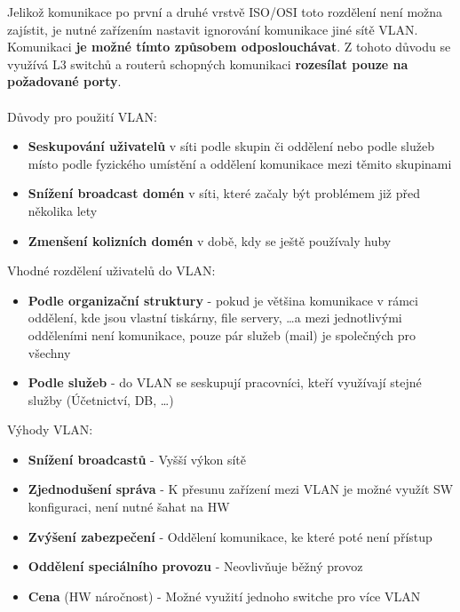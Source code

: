Jelikož komunikace po první a druhé vrstvě ISO/OSI toto rozdělení není možna zajístit, je nutné zařízením nastavit ignorování komunikace jiné sítě VLAN.
Komunikaci \textbf{je možné tímto způsobem odposlouchávat}.
Z tohoto důvodu se využívá L3 switchů a routerů schopných komunikaci \textbf{rozesílat pouze na požadované porty}. \\
\\
Důvody pro použití VLAN:
\begin{itemize}
  \item \textbf{Seskupování uživatelů} v síti podle skupin či oddělení nebo podle služeb místo podle fyzického umístění a oddělení komunikace mezi těmito skupinami
  \item \textbf{Snížení broadcast domén} v síti, které začaly být problémem již před několika lety
  \item \textbf{Zmenšení kolizních domén} v době, kdy se ještě používaly huby
\end{itemize}
Vhodné rozdělení uživatelů do VLAN:
\begin{itemize}
  \item \textbf{Podle organizační struktury} - pokud je většina komunikace v rámci oddělení, kde jsou vlastní tiskárny, file servery, \dots a mezi jednotlivými odděleními není komunikace, pouze pár služeb (mail) je společných pro všechny
  \item \textbf{Podle služeb} - do VLAN se seskupují pracovníci, kteří využívají stejné služby (Účetnictví, DB, \dots)
\end{itemize}
Výhody VLAN:
\begin{itemize}
  \item \textbf{Snížení broadcastů} - Vyšší výkon sítě
  \item \textbf{Zjednodušení správa} - K přesunu zařízení mezi VLAN je možné využít SW konfiguraci, není nutné šahat na HW
  \item \textbf{Zvýšení zabezpečení} - Oddělení komunikace, ke které poté není přístup
  \item \textbf{Oddělení speciálního provozu} - Neovlivňuje běžný provoz
  \item \textbf{Cena} (HW náročnost) - Možné využití jednoho switche pro více VLAN
\end{itemize}
